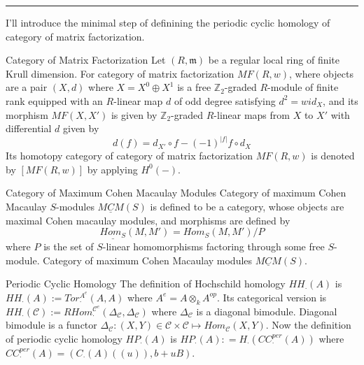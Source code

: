 \documentclass{article}
\begin{document}
\vspace{0.5cm}
\noindent\rule{\textwidth}{0.4pt}
\vspace{0.5cm}


\noindent
I'll introduce the minimal step of definining the periodic cyclic homology of category of matrix factorization.


\begin{definition}{Category of Matrix Factorization}{}
Let $(R,\mathfrak{m})$ be a regular local ring of finite Krull dimension.
For category of matrix factorization $MF(R,w)$, where objects are a pair $(X,d)$ 
where $X=X^0 \oplus X^1$ is a free $\mathbb{Z}_2$-graded $R$-module of finite rank
equipped with an $R$-linear map $d$ of odd degree satisfying $d^2 = w id_X$,
and its morphism $MF(X,X')$ is given by $\mathbb{Z}_2$-graded $R$-linear maps from $X$ to $X'$ with differential $d$ given by
\[ d (f) = d_{X'}\circ f - (-1)^{|f|} f\circ d_X \]
Its homotopy category of category of matrix factorization $MF(R,w)$ is denoted by $[MF(R,w)]$ by applying $H^0(-)$.
\end{definition}


\begin{definition}{Category of Maximum Cohen Macaulay Modules}{}
Category of maximum Cohen Macaulay $S$-modules $\underline{MCM}(S)$ is defined to be a category,
whose objects are maximal Cohen macaulay modules, and morphisms are defined by 
\[ \underline{Hom_S}(M,M')_{} = Hom_S(M,M')/P \]
where $P$ is the set of $S$-linear homomorphisms factoring through some free $S$-module.
Category of maximum Cohen Macaulay modules $\underline{MCM}(S)$.
\end{definition}


\begin{definition}{Periodic Cyclic Homology}{}
The definition of Hochschild homology $HH_\cdot (A)$ is $HH_\cdot(A) := Tor_\cdot^{A^e}(A,A)$
where $A^e = A\otimes_k A^{op}$. Its categorical version is 
$HH_\cdot(\mathcal{C}) := RHom_\cdot^{\mathcal{C}^e}(\Delta_\mathcal{C}, \Delta_\mathcal{C})$
where $\Delta_\mathcal{C}$ is a diagonal bimodule. Diagonal bimodule is a functor 
$\Delta_\mathcal{C}: (X,Y) \in \mathcal{C}\times \mathcal{C} \mapsto Hom_{\mathcal{C}}(X,Y)$. 
Now the definition of periodic cyclic homology $HP_\cdot (A)$ is
$HP_\cdot (A) : = H_\cdot (CC_\cdot^{per} (A))$ where $CC_\cdot^{per} (A) = (C_\cdot(A)((u)), b+uB)$.
\end{definition}
\end{document}
